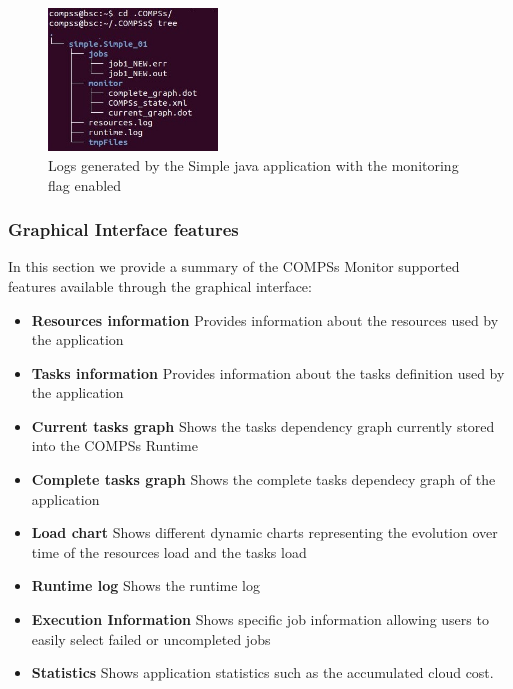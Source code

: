 \begin{figure}[ht!]
  \centering
    \includegraphics[width=0.4\textwidth]{./Sections/4_Tools/Figures/logs_with_monitor.jpeg}
    \caption{Logs generated by the Simple java application with the monitoring flag enabled}
    \label{fig:simple_logs_monitor}
\end{figure}

\newpage
\subsubsection{Graphical Interface features}
In this section we provide a summary of the COMPSs Monitor supported features available through the graphical interface:
\begin{itemize}
 \item \textbf{Resources information} \newline
	Provides information about the resources used by the application
 \item \textbf{Tasks information} \newline
	Provides information about the tasks definition used by the application
 \item \textbf{Current tasks graph} \newline
	Shows the tasks dependency graph currently stored into the COMPSs Runtime
 \item \textbf{Complete tasks graph} \newline
	Shows the complete tasks dependecy graph of the application
 \item \textbf{Load chart} \newline
	Shows different dynamic charts representing the evolution over time of the resources load and the tasks load
 \item \textbf{Runtime log} \newline
	Shows the runtime log
 \item \textbf{Execution Information} \newline
	Shows specific job information allowing users to easily select failed or uncompleted jobs
 \item \textbf{Statistics} \newline
	Shows application statistics such as the accumulated cloud cost. 
\end{itemize}


